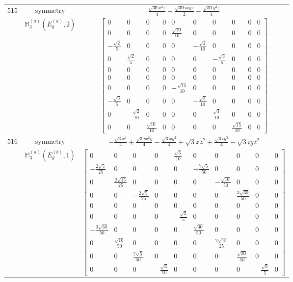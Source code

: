 \documentclass[fleqn,8pt,landscape]{jsarticle}
\begin{document}
\begin{longtable}{ccc}
$ 515 $ & $ \text{symmetry} $ & $ \frac{\sqrt{30} x^{2} z}{4} - \frac{\sqrt{30} i x y z}{2} - \frac{\sqrt{30} y^{2} z}{4} $ \\
$  $ & $ \mathbb{M}_{3}^{(a)}(E_{g}^{(a)},2) $ & $ \begin{bmatrix} 0 & 0 & 0 & 0 & 0 & 0 & 0 & 0 & 0 & 0 \\ 0 & 0 & 0 & 0 & \frac{\sqrt{10}}{10} & 0 & 0 & 0 & 0 & 0 \\ - \frac{\sqrt{2}}{5} & 0 & 0 & 0 & 0 & - \frac{\sqrt{2}}{10} & 0 & 0 & 0 & 0 \\ 0 & \frac{\sqrt{2}}{5} & 0 & 0 & 0 & 0 & - \frac{\sqrt{3}}{5} & 0 & 0 & 0 \\ 0 & 0 & 0 & 0 & 0 & 0 & 0 & 0 & 0 & 0 \\ 0 & 0 & 0 & 0 & 0 & 0 & 0 & 0 & 0 & 0 \\ 0 & 0 & 0 & 0 & - \frac{\sqrt{15}}{10} & 0 & 0 & 0 & 0 & 0 \\ - \frac{\sqrt{3}}{5} & 0 & 0 & 0 & 0 & - \frac{\sqrt{3}}{10} & 0 & 0 & 0 & 0 \\ 0 & - \frac{\sqrt{2}}{10} & 0 & 0 & 0 & 0 & \frac{\sqrt{3}}{10} & 0 & 0 & 0 \\ 0 & 0 & \frac{\sqrt{10}}{10} & 0 & 0 & 0 & 0 & \frac{\sqrt{15}}{10} & 0 & 0 \end{bmatrix} $ \\ \hline
$ 516 $ & $ \text{symmetry} $ & $ - \frac{\sqrt{3} x^{3}}{4} + \frac{\sqrt{3} i x^{2} y}{4} - \frac{\sqrt{3} x y^{2}}{4} + \sqrt{3} x z^{2} + \frac{\sqrt{3} i y^{3}}{4} - \sqrt{3} i y z^{2} $ \\
$  $ & $ \mathbb{M}_{3}^{(a)}(E_{g}^{(b)},1) $ & $ \begin{bmatrix} 0 & 0 & 0 & 0 & \frac{\sqrt{3}}{10} & 0 & 0 & 0 & 0 & 0 \\ - \frac{2 \sqrt{5}}{25} & 0 & 0 & 0 & 0 & - \frac{7 \sqrt{5}}{50} & 0 & 0 & 0 & 0 \\ 0 & \frac{2 \sqrt{15}}{25} & 0 & 0 & 0 & 0 & - \frac{\sqrt{10}}{50} & 0 & 0 & 0 \\ 0 & 0 & - \frac{2 \sqrt{5}}{25} & 0 & 0 & 0 & 0 & \frac{3 \sqrt{30}}{50} & 0 & 0 \\ 0 & 0 & 0 & 0 & 0 & 0 & 0 & 0 & 0 & 0 \\ 0 & 0 & 0 & 0 & - \frac{\sqrt{3}}{5} & 0 & 0 & 0 & 0 & 0 \\ - \frac{3 \sqrt{30}}{50} & 0 & 0 & 0 & 0 & \frac{\sqrt{30}}{50} & 0 & 0 & 0 & 0 \\ 0 & \frac{\sqrt{10}}{50} & 0 & 0 & 0 & 0 & \frac{2 \sqrt{15}}{25} & 0 & 0 & 0 \\ 0 & 0 & \frac{7 \sqrt{5}}{50} & 0 & 0 & 0 & 0 & \frac{\sqrt{30}}{50} & 0 & 0 \\ 0 & 0 & 0 & - \frac{\sqrt{3}}{10} & 0 & 0 & 0 & 0 & - \frac{\sqrt{3}}{5} & 0 \end{bmatrix} $ \\ \hline

\end{longtable}
\end{document}

